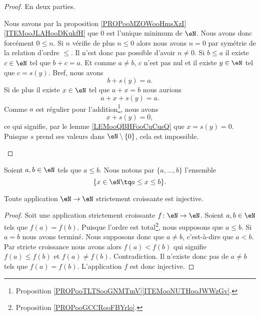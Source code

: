 \begin{proof}
	En deux parties.
	\begin{subproof}
		Nous savons par la proposition \ref{PROPooMZOWooHmsXzI}\ref{ITEMooJLAHooDKukfH} que \( 0\) est l'unique minimum de \( \eN\). Nous avons donc forcément \( 0\leq n\). Si \( n\) vérifie de plus \( n\leq 0\) alors nous avons \( n=0\) par symétrie de la relation d'ordre \( \leq\). Il n'est donc pas possible d'avoir \( n\neq 0\).
		Si \( b\leq a\) il existe \( c\in \eN\) tel que \( b+c=a\). Et comme \( a\neq b\), \( c\) n'est pas nul et il existe \( y\in \eN\) tel que \( c=s(y)\). Bref, nous avons
		\begin{equation}
			b+s(y)=a.
		\end{equation}
		Si de plus il existe \( x\in \eN\) tel que \( a+x=b\) nous aurions
		\begin{equation}
			a+x+s(y)=a.
		\end{equation}
		Comme \( a\) est régulier pour l'addition\footnote{Proposition \ref{PROPooTLTSooGNMTmV}\ref{ITEMooNUTHooJWWzGv}.}, nous avons
		\begin{equation}
			x+s(y)=0,
		\end{equation}
		ce qui signifie, par le lemme \ref{LEMooQBHFooCuCusQ} que \( x=s(y)=0\). Puisque \( s\) prend ses valeurs dans \( \eN\setminus\{ 0 \}\), cela est impossible.
	\end{subproof}
\end{proof}

\begin{definition}      \label{DEFooKBUFooLvMHrf}
	Soient \( a,b\in \eN\) tels que \( a\leq b\). Nous notons par \( \{ a,\ldots, b \}\) l'ensemble
	\begin{equation}
		\{ x\in \eN\tq a\leq x\leq b \}.
	\end{equation}
\end{definition}

\begin{proposition}     \label{PROPooFYMJooWihvhk}
	Toute application \( \eN\to \eN\) strictement croissante est injective.
\end{proposition}

\begin{proof}
	Soit une application strictement croissante \( f\colon \eN\to \eN\). Soient \( a,b\in \eN\) tels que \( f(a)=f(b)\). Puisque l'ordre est total\footnote{Proposition \ref{PROPooGCCRooFBYrlo}.}, nous supposons que \( a\leq b\). Si \( a=b\) nous avons terminé. Nous supposons donc que \( a\neq b\), c'est-à-dire que \( a<b\). Par stricte croissance nous avons alors \( f(a)<f(b)\) qui signifie \( f(a)\leq f(b)\) et \( f(a)\neq f(b)\). Contradiction. Il n'existe donc pas de \( a\neq b\) tels que \( f(a)=f(b)\). L'application \( f\) est donc injective.
\end{proof}

